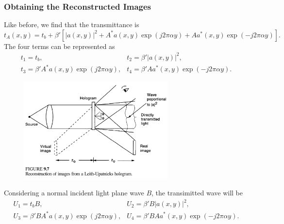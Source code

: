 \documentclass[en,hazy,device=normal,blue,14pt]{elegantnote}
\begin{document}
\subsubsection{Obtaining the Reconstructed Images}
Like before, we find that the transmittance is
\begin{equation}
  {t_A}\left( {x,y} \right) = {t_b} + \beta '\left[ {{{\left| {a\left( {x,y} \right)} \right|}^2} + {A^*}a\left( {x,y} \right)\exp \left( {j2\pi \alpha y} \right) + A{a^*}\left( {x,y} \right)\exp \left( { - j2\pi \alpha y} \right)} \right].
\end{equation}
The four terms can be represented as
\begin{equation}
  \begin{array}{*{20}{c}}
    {{t_1} = {t_b},}&{{t_2} = \beta '{{\left| {a\left( {x,y} \right)} \right|}^2},}\\
    {{t_3} = \beta '{A^*}a\left( {x,y} \right)\exp \left( {j2\pi \alpha y} \right),}&{{t_4} = \beta' A{a^*}\left( {x,y} \right)\exp \left( { - j2\pi \alpha y} \right).}
    \end{array}
\end{equation}

\begin{figure}[htbp]
  \centering
  \includegraphics[width=0.7\textwidth]{7.png}
\end{figure}

Considering a normal incident light plane wave $B$, the transimitted wave will be
\begin{equation}
  \begin{array}{*{20}{c}}
    {{U_1} = {t_b}B,}&{{U_2} = \beta 'B{{\left| {a\left( {x,y} \right)} \right|}^2},}\\
    {{U_3} = \beta 'B{A^*}a\left( {x,y} \right)\exp \left( {j2\pi \alpha y} \right),}&{{U_4} = \beta 'BA{a^*}\left( {x,y} \right)\exp \left( { - j2\pi \alpha y} \right).}
    \end{array}
\end{equation}
\end{document}

